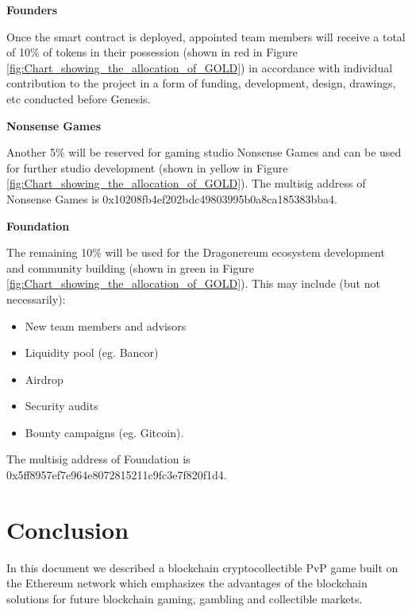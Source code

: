 \documentclass[12pt]{article}
\begin{document}
\textbf{Founders}\par

Once the smart contract is deployed, appointed team members will receive a total of 10$\%$ of tokens in their possession (shown in red in Figure \ref{fig:Chart_showing_the_allocation_of_GOLD}) in accordance with individual contribution to the project in a form of funding, development, design, drawings, etc conducted before Genesis.\par

\textbf{Nonsense Games}\par

Another 5$\%$ will be reserved for gaming studio Nonsense Games and can be used for further studio development (shown in yellow in Figure \ref{fig:Chart_showing_the_allocation_of_GOLD}). The multisig address of Nonsense Games is 0x10208fb4ef202bdc49803995b0a8ca185383bba4.\par

\textbf{Foundation}\par

The remaining 10$\%$  will be used for the Dragonereum ecosystem development and community building (shown in green in Figure \ref{fig:Chart_showing_the_allocation_of_GOLD}). This may include (but not necessarily):\par

\begin{itemize}
	\item New team members and advisors\par

	\item Liquidity pool (eg. Bancor)\par

	\item Airdrop\par

	\item Security audits\par

	\item Bounty campaigns (eg. Gitcoin).
\end{itemize}\par

The multisig address of Foundation is 0x5ff8957ef7e964e8072815211c9fc3e7f820f1d4.\par


\newpage

\vspace{\baselineskip}\section{Conclusion}
In this document we described a blockchain cryptocollectible PvP game built on the Ethereum network which emphasizes the advantages of the blockchain solutions for future blockchain gaming, gambling and collectible markets.  \par
\end{document}

